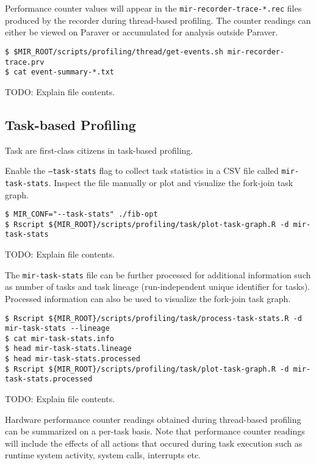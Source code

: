 \documentclass[11pt,a4paper]{article}
\begin{document}
Performance counter values will appear in the \texttt{mir-recorder-trace-*.rec} files produced by the recorder during thread-based profiling. The counter readings can either be viewed on Paraver or accumulated for analysis outside Paraver.

\begin{lstlisting}[style=MyInputStyle]
$ $MIR_ROOT/scripts/profiling/thread/get-events.sh mir-recorder-trace.prv
$ cat event-summary-*.txt
\end{lstlisting}

TODO: Explain file contents.

\subsection{Task-based Profiling}\label{task-based-profiling}

Task are first-class citizens in task-based profiling.

Enable the \texttt{--task-stats} flag to collect task statistics in a CSV file called \texttt{mir-task-stats}. Inspect the file manually or plot and visualize the fork-join task graph.

\begin{lstlisting}[style=MyInputStyle]
$ MIR_CONF="--task-stats" ./fib-opt
$ Rscript ${MIR_ROOT}/scripts/profiling/task/plot-task-graph.R -d mir-task-stats
\end{lstlisting}

TODO: Explain file contents.

The \texttt{mir-task-stats} file can be further processed for additional information such as number of tasks and task lineage (run-independent unique identifier for tasks). Processed information can also be used to visualize the fork-join task graph.

\begin{lstlisting}[style=MyInputStyle]
$ Rscript ${MIR_ROOT}/scripts/profiling/task/process-task-stats.R -d mir-task-stats --lineage
$ cat mir-task-stats.info
$ head mir-task-stats.lineage
$ head mir-task-stats.processed
$ Rscript ${MIR_ROOT}/scripts/profiling/task/plot-task-graph.R -d mir-task-stats.processed
\end{lstlisting}

TODO: Explain file contents.

Hardware performance counter readings obtained during thread-based profiling can be summarized on a per-task basis. Note that performance counter readings will include the effects of all actions that occured during task execution such as runtime system activity, system calls, interrupts etc.
\end{document}
